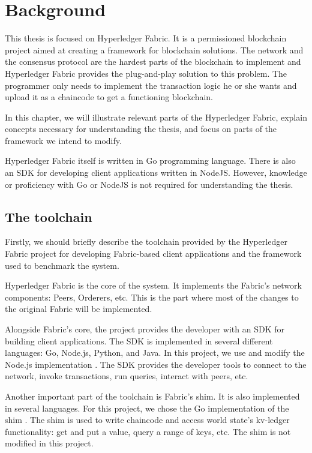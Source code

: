 \chapter{Background}
\label{chapter:background}

This thesis is focused on Hyperledger Fabric. It is a permissioned blockchain project aimed at creating a framework for blockchain solutions\cite{lit:HF:ADOSPB}. The network and the consensus protocol are the hardest parts of the blockchain to implement and Hyperledger Fabric provides the plug-and-play solution to this problem. The programmer only needs to implement the transaction logic he or she wants and upload it as a chaincode to get a functioning blockchain.

In this chapter, we will illustrate relevant parts of the Hyperledger Fabric, explain concepts necessary for understanding the thesis, and focus on parts of the framework we intend to modify.

Hyperledger Fabric itself is written in Go programming language. There is also an SDK for developing client applications written in NodeJS.
However, knowledge or proficiency with Go or NodeJS is not required for understanding the thesis.

\section{The toolchain}\label{sec:back-tools}

Firstly, we should briefly describe the toolchain provided by the Hyperledger Fabric project for developing Fabric-based client applications and the framework used to benchmark the system.

Hyperledger Fabric is the core of the system. It implements the Fabric's network components: Peers, Orderers, etc. This is the part where most of the changes to the original Fabric will be implemented.

Alongside Fabric's core, the project provides the developer with an SDK for building client applications. The SDK is implemented in several different languages: Go, Node.js, Python, and Java. In this project, we use and modify the Node.js implementation \cite{lit:fabric-sdk-node}. The SDK provides the developer tools to connect to the network, invoke transactions, run queries, interact with peers, etc.

Another important part of the toolchain is Fabric's shim. It is also implemented in several languages. For this project, we chose the Go implementation of the shim \cite{lit:fabric-shim-go}. The shim is used to write chaincode and access world state's kv-ledger functionality: get and put a value, query a range of keys, etc. The shim is not modified in this project.

